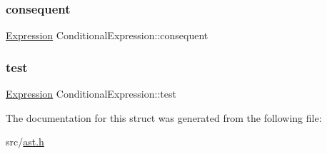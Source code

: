 \subsubsection{\texorpdfstring{consequent}{consequent}}
{\footnotesize\ttfamily \hyperlink{ast_8h_a4cb273a4d960cd13ea17d08f254493e8}{Expression} Conditional\+Expression\+::consequent}

\mbox{\label{struct_conditional_expression_a85dee3d7e20a322d152a5f9185177488}} 
\subsubsection{\texorpdfstring{test}{test}}
{\footnotesize\ttfamily \hyperlink{ast_8h_a4cb273a4d960cd13ea17d08f254493e8}{Expression} Conditional\+Expression\+::test}



The documentation for this struct was generated from the following file\+:\begin{DoxyCompactItemize}
\item 
src/\hyperlink{ast_8h}{ast.\+h}\end{DoxyCompactItemize}
